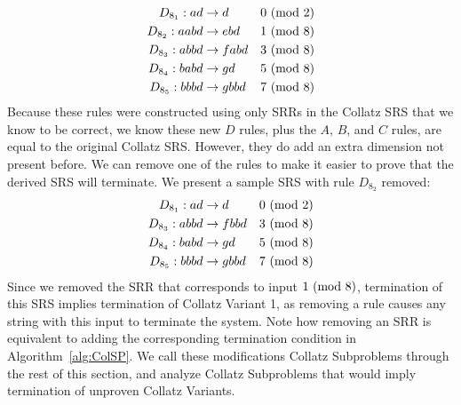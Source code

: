 \begin{align*}
    D_{8_1}: ad &\rightarrow d &\text{$0\ (\mathrm{mod}\ 2)$}\\
    D_{8_2}: aabd &\rightarrow ebd &\text{$1\ (\mathrm{mod}\ 8)$}\\
    D_{8_3}: abbd &\rightarrow fabd &\text{$3\ (\mathrm{mod}\ 8)$}\\
    D_{8_4}: babd &\rightarrow gd &\text{$5\ (\mathrm{mod}\ 8)$}\\
    D_{8_5}: bbbd &\rightarrow gbbd &\text{$7\ (\mathrm{mod}\ 8)$}
\end{align*}
Because these rules were constructed using only SRRs in the Collatz SRS that we know to be correct, we know these new $D$ rules, plus the $A$, $B$, and $C$ rules, are equal to the original Collatz SRS. However, they do add an extra dimension not present before. We can remove one of the rules to make it easier to prove that the derived SRS will terminate. We present a sample SRS with rule $D_{8_2}$ removed:
\begin{align*}
    D_{8_1}: ad &\rightarrow d &\text{$0\ (\mathrm{mod}\ 2)$}\\
    D_{8_3}: abbd &\rightarrow fbbd &\text{$3\ (\mathrm{mod}\ 8)$}\\
    D_{8_4}: babd &\rightarrow gd &\text{$5\ (\mathrm{mod}\ 8)$}\\
    D_{8_5}: bbbd &\rightarrow gbbd &\text{$7\ (\mathrm{mod}\ 8)$}
\end{align*}
Since we removed the SRR that corresponds to input $1 \ (\mathrm{mod}\ 8)$, termination of this SRS implies termination of Collatz Variant 1, as removing a rule causes any string with this input to terminate the system. Note how removing an SRR is equivalent to adding the corresponding termination condition in Algorithm~\ref{alg:ColSP}. We call these modifications Collatz Subproblems through the rest of this section, and analyze Collatz Subproblems that would imply termination of unproven Collatz Variants.\par
